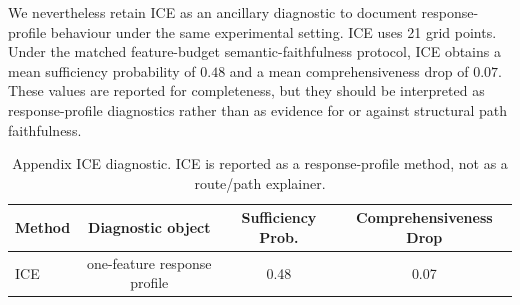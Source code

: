 \documentclass[runningheads]{llncs}
\begin{document}
We nevertheless retain ICE as an ancillary diagnostic to document response-profile behaviour under the same experimental setting. ICE uses 21 grid points. Under the matched feature-budget semantic-faithfulness protocol, ICE obtains a mean sufficiency probability of $0.48$ and a mean comprehensiveness drop of $0.07$. These values are reported for completeness, but they should be interpreted as response-profile diagnostics rather than as evidence for or against structural path faithfulness.

\begin{table}[h!]
\centering
\small
\caption{Appendix ICE diagnostic. ICE is reported as a response-profile method, not as a route/path explainer.}
\label{tab:ice-appendix}
\begin{tabular}{lccc}
\toprule
Method & Diagnostic object & Sufficiency Prob. & Comprehensiveness Drop \\
\midrule
ICE & one-feature response profile & 0.48 & 0.07 \\
\bottomrule
\end{tabular}
\end{table}



\end{document}
